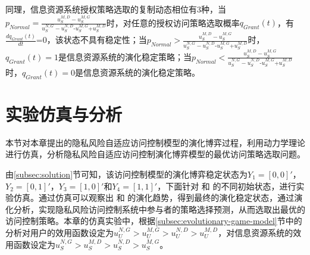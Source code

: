  同理，信息资源系统授权策略选取的复制动态相位有3种，当${{p}_{Normal}}=\frac{u_{S}^{M,D}-u_{S}^{M,G}}{u_{S}^{N,G}-u_{S}^{N,D}\text{-}u_{S}^{M,G}\text{+}u_{S}^{M,D}}$时，对任意的授权访问策略选取概率$q_{Grant}(t)$，有$\frac{d{{q}_{Grant}}(t)}{dt}\text{=0}$，该状态不具有稳定性；当${{p}_{Normal}}>\frac{u_{S}^{M,D}-u_{S}^{M,G}}{u_{S}^{N,G}-u_{S}^{N,D}\text{-}u_{S}^{M,G}\text{+}u_{S}^{M,D}}$时，$q_{Grant}(t)=1$是信息资源系统的演化稳定策略；当${{p}_{Normal}}<\frac{u_{S}^{M,D}-u_{S}^{M,G}}{u_{S}^{N,G}-u_{S}^{N,D}\text{-}u_{S}^{M,G}\text{+}u_{S}^{M,D}}$时，$q_{Grant}(t)=0$是信息资源系统的演化稳定策略。
 
 
 \section{实验仿真与分析}
本节对本章提出的隐私风险自适应访问控制模型的演化博弈过程，利用动力学理论进行仿真，分析隐私风险自适应访问控制演化博弈模型的最优访问策略选取问题。

 由\ref{subsec:solution}节可知，该访问控制模型的演化博弈稳定状态为${{Y}_{1}}=[0,0]'$，${{Y}_{2}}=[0,1]'$，${{Y}_{3}}=[1,0]'$和${{Y}_{4}}=[1,1]'$，下面针对 和 的不同初始状态，进行实验仿真。通过仿真可以观察出 和 的演化趋势，得到最终的演化稳定状态，通过演化分析，实现隐私风险访问控制系统中参与者的策略选择预测，从而选取出最优的访问控制策略。本章的仿真实验中，根据\ref{subsec:evolutionary-game-model}节中的分析对用户的效用函数设定为$u_{U}^{N,G}>u_{U}^{M,G}>u_{U}^{N,D}>u_{U}^{M,D}$，对信息资源系统的效用函数设定为$u_{S}^{N,G}>u_{S}^{M,D}>u_{S}^{N,D}>u_{S}^{M,G}$。

